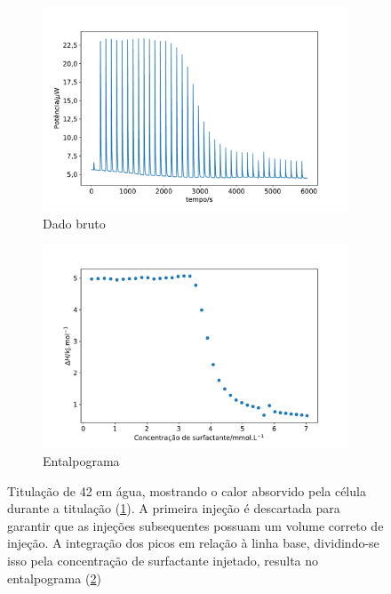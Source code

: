 		\begin{figure}[h]
			\begin{subfigure}[t]{0.5\textwidth}
				\centering
				\includegraphics[width=\textwidth]{./imagens/itc/raw_itc_exemplo}
				\caption{Dado bruto}
				\label{fig:ITC_raw_exemplo}
			\end{subfigure}%
			\begin{subfigure}[t]{0.5\textwidth}
				\centering
				\includegraphics[width=\textwidth]{./imagens/itc/inj_itc_exemplo}
				\caption{Entalpograma}
				\label{fig:ITC_inj_exemplo}
			\end{subfigure}
		
			\caption{Titulação de \TTAB{} 42 \mM{} em água, mostrando o calor absorvido pela célula durante a titulação (\ref{fig:ITC_raw_exemplo}). A primeira injeção é descartada para garantir que as injeções subsequentes possuam um volume correto de injeção. A integração dos picos em relação à linha base, dividindo-se isso pela concentração de surfactante injetado, resulta no entalpograma (\ref{fig:ITC_inj_exemplo})}
			\label{fig:ITC_exemplo}
		\end{figure}
		
